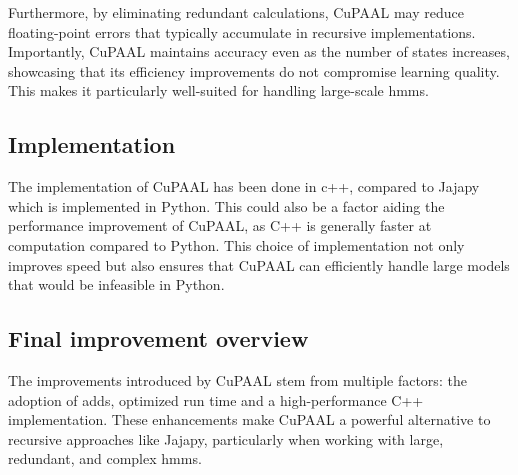 Furthermore, by eliminating redundant calculations, CuPAAL may reduce floating-point errors that typically accumulate in recursive implementations.
Importantly, CuPAAL maintains accuracy even as the number of states increases, showcasing that its efficiency improvements do not compromise learning quality.
This makes it particularly well-suited for handling large-scale \glspl{hmm}.


\subsection{Implementation}\label{subsec:improvements_implementation}
The implementation of CuPAAL has been done in c++, compared to Jajapy which is implemented in Python.
This could also be a factor aiding the performance improvement of CuPAAL, as C++ is generally faster at computation compared to Python.
This choice of implementation not only improves speed but also ensures that CuPAAL can efficiently handle large models that would be infeasible in Python.

\subsection{Final improvement overview}\label{improvements_overview}
The improvements introduced by CuPAAL stem from multiple factors: the adoption of \glspl{add}, optimized run time and a high-performance C++ implementation.
These enhancements make CuPAAL a powerful alternative to recursive approaches like Jajapy, particularly when working with large, redundant, and complex \glspl{hmm}.





